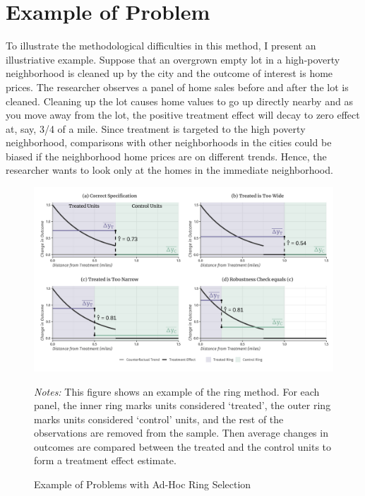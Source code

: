 \documentclass[10pt]{article}
\begin{document}
\section{Example of Problem}\label{sec:example}

To illustrate the methodological difficulties in this method, I present an illustriative example. Suppose that an overgrown empty lot in a high-poverty neighborhood is cleaned up by the city and the outcome of interest is home prices. The researcher observes a panel of home sales before and after the lot is cleaned. Cleaning up the lot causes home values to go up directly nearby and as you move away from the lot, the positive treatment effect will decay to zero effect at, say, 3/4 of a mile. Since treatment is targeted to the high poverty neighborhood, comparisons with other neighborhoods in the cities could be biased if the neighborhood home prices are on different trends. Hence, the researcher wants to look only at the homes in the immediate neighborhood.


\begin{figure}[tb]
    \caption{Example of Problems with Ad-Hoc Ring Selection}
    \label{fig:problems}

    \begin{adjustbox}{width = 1.1\textwidth, center}
        \includegraphics[width=\textwidth]{../../figures/example.pdf}
    \end{adjustbox}

    {\footnotesize \emph{Notes:} This figure shows an example of the ring method. For each panel, the inner ring marks units considered `treated', the outer ring marks units considered `control' units, and the rest of the observations are removed from the sample. Then average changes in outcomes are compared between the treated and the control units to form a treatment effect estimate.}
\end{figure}
\end{document}
